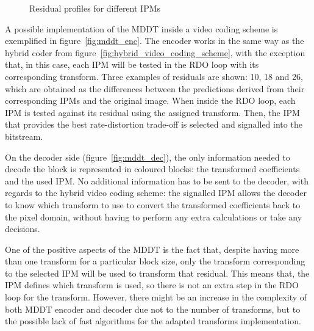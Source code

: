 \documentclass[11pt,a4paper,openright,twoside]{book}
\numberwithin{equation}{section} %
\numberwithin{figure}{section} %
\numberwithin{table}{section} %
\begin{document}
\begin{figure}[tb]
	\hfill
	\hfill
	\caption{Residual profiles for different \acsp{IPM}}
	\label{fig:residual_differences}
\end{figure}

A possible implementation of the \ac{MDDT} inside a video coding scheme is
exemplified in figure~\ref{fig:mddt_enc}.
The encoder works in the same way as the hybrid coder from
figure~\ref{fig:hybrid_video_coding_scheme}, with the exception that, in this
case, each \ac{IPM} will be tested in the \ac{RDO} loop with its corresponding
transform.
Three examples of residuals are shown: 10, 18 and 26, which are obtained as
the differences between the predictions derived from their corresponding
\acp{IPM} and the original image.
When inside the \ac{RDO} loop, each \ac{IPM} is tested against its residual
using the assigned transform.
Then, the \ac{IPM} that provides the best rate-distortion trade-off is
selected and signalled into the bitstream.

On the decoder side (figure~\ref{fig:mddt_dec}), the only information needed
to decode the block is represented in coloured blocks:
the transformed coefficients and the used \ac{IPM}.
No additional information has to be sent to the decoder, with regards to the
hybrid video coding scheme:
the signalled \ac{IPM} allows the decoder to know which transform to use to
convert the transformed coefficients back to the pixel domain, without having
to perform any extra calculations or take any decisions.

One of the positive aspects of the \ac{MDDT} is the fact that, despite having
more than one transform for a particular block size, only the transform
corresponding to the selected \ac{IPM} will be used to transform that
residual.
This means that, the \ac{IPM} defines which transform is used, so there is not
an extra step in the \ac{RDO} loop for the transform.
However, there might be an increase in the complexity of both \ac{MDDT}
encoder and decoder due not to the number of transforms, but to the possible
lack of fast algorithms for the adapted transforms implementation.
\end{document}
